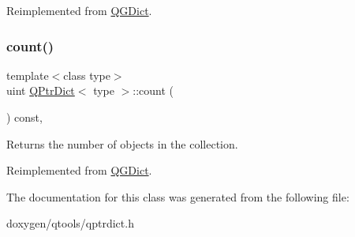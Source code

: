 Reimplemented from \mbox{\hyperlink{class_q_g_dict_a991443b3568622b97772e234fe61dfd7}{Q\+G\+Dict}}.

\mbox{\label{class_q_ptr_dict_a05675b8aa91387dd5cbb74eb881e17d1}} 
\subsubsection{\texorpdfstring{count()}{count()}}
{\footnotesize\ttfamily template$<$class type$>$ \\
uint \mbox{\hyperlink{class_q_ptr_dict}{Q\+Ptr\+Dict}}$<$ type $>$\+::count (\begin{DoxyParamCaption}{ }\end{DoxyParamCaption}) const\hspace{0.3cm}{\ttfamily [inline]}, {\ttfamily [virtual]}}

Returns the number of objects in the collection. 

Reimplemented from \mbox{\hyperlink{class_q_g_dict_a13f6cc9bdbfe37db323b47947c1e017c}{Q\+G\+Dict}}.



The documentation for this class was generated from the following file\+:\begin{DoxyCompactItemize}
\item 
doxygen/qtools/qptrdict.\+h\end{DoxyCompactItemize}
